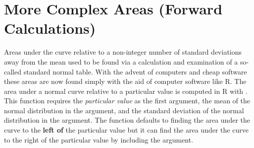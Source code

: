 \documentclass[10pt,openany]{book}\usepackage[]{graphicx}\usepackage[]{color}
\begin{document}
\section[Forward Calculations]{More Complex Areas (Forward Calculations)}
Areas under the curve relative to a non-integer number of standard deviations away from the mean used to be found via a calculation and examination of a so-called standard normal table.  With the advent of computers and cheap software these areas are now found simply with the aid of computer software like R.  The area under a normal curve relative to a particular value is computed in R with .  This function requires the \textit{particular value} as the first argument, the mean of the normal distribution in the  argument, and the standard deviation of the normal distribution in the  argument.  The  function defaults to finding the area under the curve to the \textbf{left of} the particular value but it can find the area under the curve to the right of the particular value by including the  argument.
\end{document}
